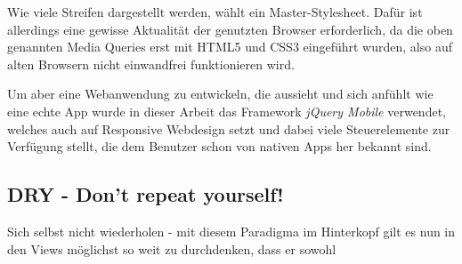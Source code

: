 Wie viele Streifen dargestellt werden, wählt ein Master-Stylesheet. Dafür ist allerdings eine gewisse Aktualität der genutzten Browser erforderlich, da die oben genannten Media Queries erst mit HTML5 und CSS3 eingeführt wurden, also auf alten Browsern nicht einwandfrei funktionieren wird.\par

Um aber eine Webanwendung zu entwickeln, die aussieht und sich \glqq anfühlt\grqq{} wie eine echte App wurde in dieser Arbeit das Framework \emph{jQuery Mobile} verwendet, welches auch auf Responsive Webdesign setzt und dabei viele Steuerelemente zur Verfügung stellt, die dem Benutzer schon von nativen Apps her bekannt sind.

\subsection{DRY - Don't repeat yourself!}
Sich selbst nicht wiederholen - mit diesem \glqq Paradigma\grqq{} im Hinterkopf gilt es nun in den Views möglichst so weit zu durchdenken, dass er sowohl 











